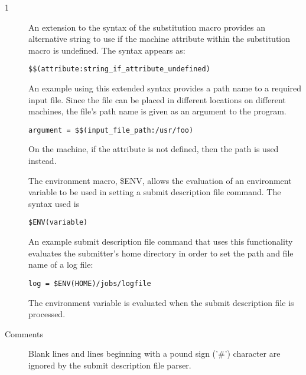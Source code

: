 \begin{ManPage}{\label{man-condor-submit}}{1}
\begin{description}
An extension to the syntax of the substitution macro provides an
alternative string to use if the machine attribute within the
substitution macro is undefined.
The syntax appears as:
\begin{verbatim} 
$$(attribute:string_if_attribute_undefined)
\end{verbatim}

An example using this extended syntax provides a path name to a
required input file.
Since the file can be placed in different locations on
different machines, the file's path name is given as an argument
to the program.
\begin{verbatim} 
argument = $$(input_file_path:/usr/foo)
\end{verbatim}
On the machine, if the attribute  is not
defined, then the path  is used instead.

The environment macro, \$ENV, allows the evaluation of an environment
variable to be used in setting a submit description file command.
The syntax used is
\begin{verbatim} 
$ENV(variable)
\end{verbatim}
An example submit description file command that uses this functionality
evaluates the submitter's home directory in order to set the
path and file name of a log file:
\begin{verbatim} 
log = $ENV(HOME)/jobs/logfile
\end{verbatim}
The environment variable is evaluated when the submit description
file is processed.

\item[Comments] Blank lines and lines beginning with a 
pound sign
('\#')
character are ignored by the submit description file parser. 

\end{description}


\begin{Options}





\end{Options}
\end{ManPage}
